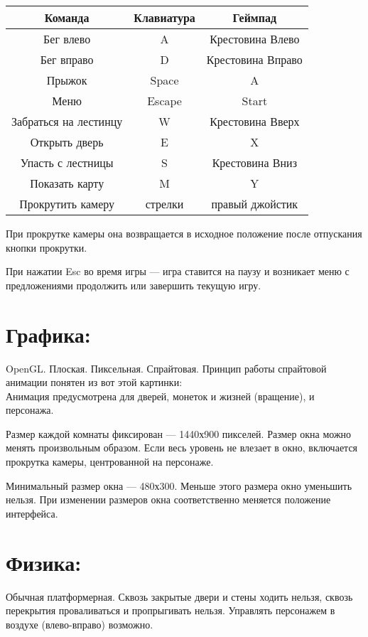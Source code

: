 \documentclass[12pt,a4paper]{article}
\begin{document}
\begin{tabulary}{\linewidth}{|C|C|C|}
\hline
Команда & Клавиатура & Геймпад\\
\hline
Бег влево & A & Крестовина Влево \\
\hline
Бег вправо & D & Крестовина Вправо \\
\hline
Прыжок & Space & A \\
\hline
Меню & Escape & Start \\
\hline
Забраться на лестинцу & W & Крестовина Вверх \\
\hline
Открыть дверь & E & X \\
\hline
Упасть с лестницы & S & Крестовина Вниз \\
\hline
Показать карту & M & Y \\
\hline
Прокрутить камеру & стрелки & правый джойстик \\
\hline
\end{tabulary}
\vspace{10pt}

При прокрутке камеры она возвращается в исходное положение после отпускания кнопки прокрутки.

При нажатии Esc во время игры --- игра ставится на паузу и возникает меню с предложениями продолжить или завершить текущую игру.\\

\section{Графика:}
OpenGL. Плоская. Пиксельная. Спрайтовая. Принцип работы спрайтовой анимации понятен из вот этой картинки:\\
Анимация предусмотрена для дверей, монеток и жизней (вращение), и персонажа.

Размер каждой комнаты фиксирован --- 1440х900 пикселей. Размер окна можно менять произвольным образом. Если весь уровень не влезает в окно, включается прокрутка камеры, центрованной на персонаже.

Минимальный размер окна --- 480х300. Меньше этого размера окно уменьшить нельзя. При изменении размеров окна соответственно меняется положение интерфейса.\\

\section{Физика:}
Обычная платформерная. Сквозь закрытые двери и стены ходить нельзя, сквозь перекрытия проваливаться и пропрыгивать нельзя. Управлять персонажем в воздухе (влево-вправо) возможно.\\
\end{document}

